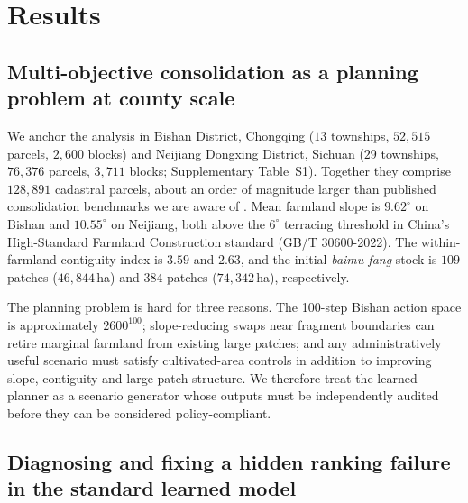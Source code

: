 \documentclass[11pt]{article}
\begin{document}
\section{Results}\label{sec:results}

\subsection{Multi-objective consolidation as a planning problem at county scale}\label{sec:problem}

We anchor the analysis in Bishan District, Chongqing ($13$ townships, $52{,}515$ parcels, $2{,}600$ blocks) and Neijiang Dongxing District, Sichuan ($29$ townships, $76{,}376$ parcels, $3{,}711$ blocks; Supplementary Table~S1). Together they comprise $128{,}891$ cadastral parcels, about an order of magnitude larger than published consolidation benchmarks we are aware of \citep{cao2012boundary,zheng2023urban}. Mean farmland slope is $9.62^{\circ}$ on Bishan and $10.55^{\circ}$ on Neijiang, both above the $6^{\circ}$ terracing threshold in China's High-Standard Farmland Construction standard (GB/T 30600-2022). The within-farmland contiguity index is $3.59$ and $2.63$, and the initial \textit{baimu fang} stock is $109$ patches ($46{,}844$\,ha) and $384$ patches ($74{,}342$\,ha), respectively.

The planning problem is hard for three reasons. The 100-step Bishan action space is approximately $2600^{100}$; slope-reducing swaps near fragment boundaries can retire marginal farmland from existing large patches; and any administratively useful scenario must satisfy cultivated-area controls in addition to improving slope, contiguity and large-patch structure. We therefore treat the learned planner as a scenario generator whose outputs must be independently audited before they can be considered policy-compliant.

\subsection{Diagnosing and fixing a hidden ranking failure in the standard learned model}\label{sec:rank}
\end{document}
